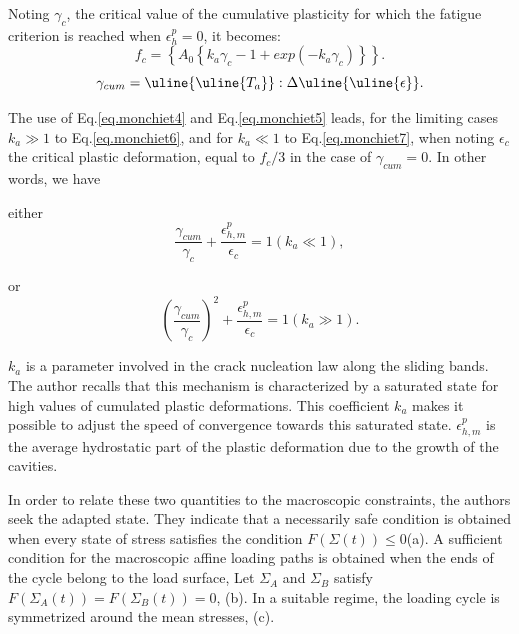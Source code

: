Noting $\gamma_c$, the critical value of the cumulative plasticity for which the fatigue criterion is reached when $\epsilon_h^p=0$, it becomes:
\begin{equation}
f_c=\left\lbrace A_0\left\lbrace k_a\gamma_{c}-1+exp\left(-k_a\gamma_{c} \right)  \right\rbrace \right\rbrace.
\label{eq.monchiet5}
\end{equation}
\begin{equation}
\gamma_{cum}=\uline{\uline{T_a}}:\Delta\uline{\uline{\epsilon}}.
\label{eq.monchiet5.5}
\end{equation}

The use of Eq.\eqref{eq.monchiet4} and Eq.\eqref{eq.monchiet5} leads, for the limiting cases $k_a \gg 1$ to Eq.\eqref{eq.monchiet6}, and for $k_a \ll 1$ to Eq.\eqref{eq.monchiet7}, when noting $\epsilon_c$ the critical plastic deformation, equal to $f_c / 3$ in the case of $\gamma_{cum}=0$. In other words, we have

either 
\begin{equation}
\dfrac{\gamma_{cum}}{\gamma_{c}}+\dfrac{\epsilon_{h,m}^p}{\epsilon_c}=1 \left( k_a \ll 1\right) ,
\label{eq.monchiet6}
\end{equation}

or
\begin{equation}
\left( \dfrac{\gamma_{cum}}{\gamma_{c}}\right) ^2+\dfrac{\epsilon_{h,m}^p}{\epsilon_c}=1 \left( k_a \gg 1\right) .
\label{eq.monchiet7}
\end{equation}

$k_a$ is a parameter involved in the crack nucleation law along the sliding bands. The author recalls that this mechanism is characterized by a saturated state for high values of cumulated plastic deformations. This coefficient $k_a$ makes it possible to adjust the speed of convergence towards this saturated state. $\epsilon_{h,m}^p$ is the average hydrostatic part of the plastic deformation due to the growth of the cavities.

In order to relate these two quantities to the macroscopic constraints, the authors seek the adapted state. They indicate that a necessarily safe condition is obtained when every state of stress satisfies the condition $F (\Sigma(t)) \leqslant 0$(a).  A sufficient condition for the macroscopic affine loading paths is obtained when the ends of the cycle belong to the load surface,
Let $\Sigma_A$ and $\Sigma_B$ satisfy $F (\Sigma_A(t)) = F (\Sigma_B (t)) = 0$, (b). In a suitable regime, the loading cycle is symmetrized around the mean stresses, (c).

